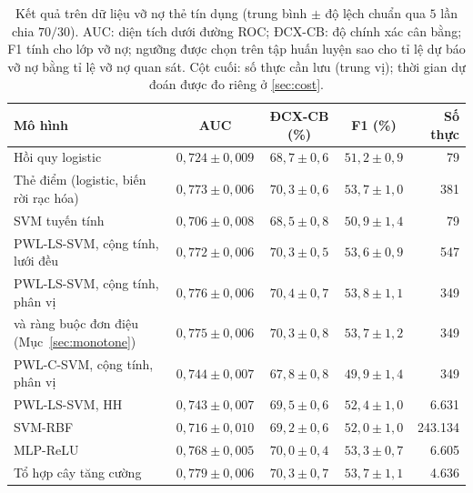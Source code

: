 \begin{table}[t]
\centering
\caption[Kết quả trên dữ liệu vỡ nợ thẻ tín dụng]{Kết quả trên dữ liệu vỡ nợ thẻ tín dụng (trung bình $\pm$ độ lệch chuẩn qua $5$ lần chia $70/30$). AUC: diện tích dưới đường ROC; ĐCX-CB: độ chính xác cân bằng; F1 tính cho lớp vỡ nợ; ngưỡng được chọn trên tập huấn luyện sao cho tỉ lệ dự báo vỡ nợ bằng tỉ lệ vỡ nợ quan sát. Cột cuối: số thực cần lưu (trung vị); thời gian dự đoán được đo riêng ở \cref{sec:cost}.}
\label{tab:credit}
\footnotesize
\setlength{\tabcolsep}{3pt}
\renewcommand{\arraystretch}{1.18}
\begin{tabular}{@{}l c c c r@{}}
\toprule
\textbf{Mô hình} & \textbf{AUC} & \textbf{ĐCX-CB (\%)} & \textbf{F1 (\%)} & \textbf{Số thực}\\
\midrule
Hồi quy logistic & $0{,}724\pm0{,}009$ & $68{,}7\pm0{,}6$ & $51{,}2\pm0{,}9$ & 79\\
Thẻ điểm (logistic, biến rời rạc hóa) & $0{,}773\pm0{,}006$ & $70{,}3\pm0{,}6$ & $53{,}7\pm1{,}0$ & 381\\
SVM tuyến tính & $0{,}706\pm0{,}008$ & $68{,}5\pm0{,}8$ & $50{,}9\pm1{,}4$ & 79\\
\midrule
PWL-LS-SVM, cộng tính, lưới đều & $0{,}772\pm0{,}006$ & $70{,}3\pm0{,}5$ & $53{,}6\pm0{,}9$ & 547\\
PWL-LS-SVM, cộng tính, phân vị & $0{,}776\pm0{,}006$ & $70{,}4\pm0{,}7$ & $53{,}8\pm1{,}1$ & 349\\
\quad và ràng buộc đơn điệu (Mục~\ref{sec:monotone}) & $0{,}775\pm0{,}006$ & $70{,}3\pm0{,}8$ & $53{,}7\pm1{,}2$ & 349\\
PWL-C-SVM, cộng tính, phân vị & $0{,}744\pm0{,}007$ & $67{,}8\pm0{,}8$ & $49{,}9\pm1{,}4$ & 349\\
PWL-LS-SVM, HH & $0{,}743\pm0{,}007$ & $69{,}5\pm0{,}6$ & $52{,}4\pm1{,}0$ & 6.631\\
\midrule
SVM-RBF & $0{,}716\pm0{,}010$ & $69{,}2\pm0{,}6$ & $52{,}0\pm1{,}0$ & 243.134\\
MLP-ReLU & $0{,}768\pm0{,}005$ & $70{,}0\pm0{,}4$ & $53{,}3\pm0{,}7$ & 6.605\\
Tổ hợp cây tăng cường & $0{,}779\pm0{,}006$ & $70{,}3\pm0{,}7$ & $53{,}7\pm1{,}1$ & 4.636\\
\bottomrule
\end{tabular}
\end{table}
